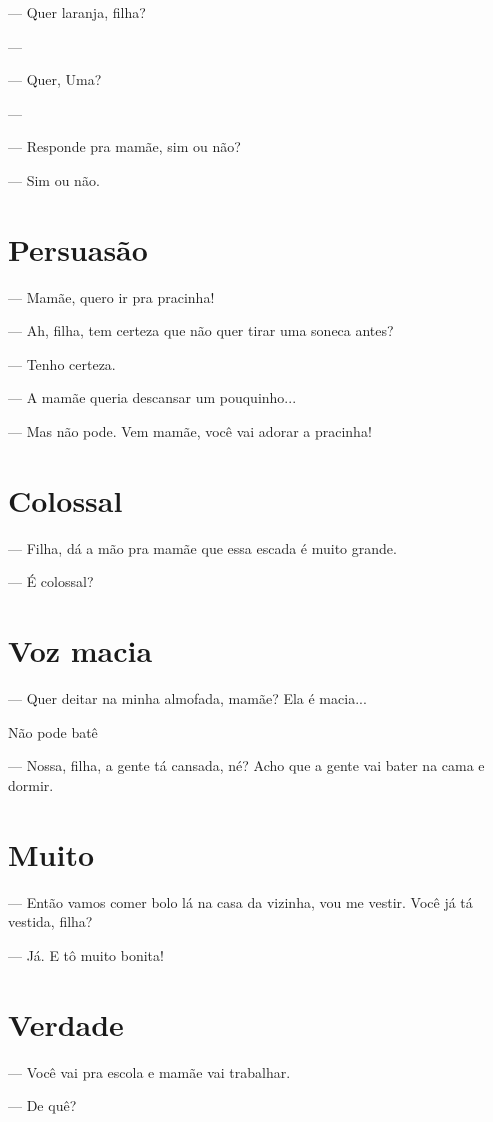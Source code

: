 — Quer laranja, filha?

—

— Quer, Uma?

—

— Responde pra mamãe, sim ou não?

— Sim ou não.

\chapter{Persuasão}

— Mamãe, quero ir pra pracinha!

— Ah, filha, tem certeza que não quer tirar uma soneca antes?

— Tenho certeza.

— A mamãe queria descansar um pouquinho...

— Mas não pode. Vem mamãe, você vai adorar a pracinha!

\chapter{Colossal}

— Filha, dá a mão pra mamãe que essa escada é muito grande.

— É colossal?

\chapter{Voz macia}

— Quer deitar na minha almofada, mamãe? Ela é macia...

Não pode batê

— Nossa, filha, a gente tá cansada, né? Acho que a gente vai bater na
cama e dormir.

\chapter{Muito}

— Então vamos comer bolo lá na casa da vizinha, vou me vestir. Você já
tá vestida, filha?

— Já. E tô muito bonita!

\chapter{Verdade}

— Você vai pra escola e mamãe vai trabalhar.

— De quê?

